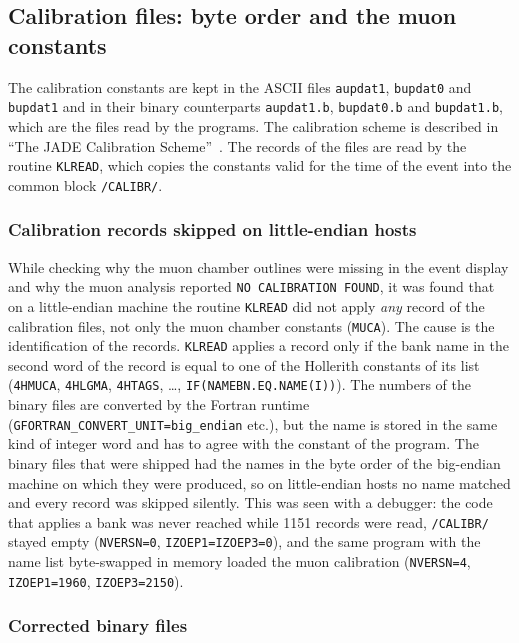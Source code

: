 \subsection{Calibration files: byte order and the muon constants}
\label{sec:calfiles}

The calibration constants are kept in the ASCII files \texttt{aupdat1}, \texttt{bupdat0} and
\texttt{bupdat1} and in their binary counterparts \texttt{aupdat1.b}, \texttt{bupdat0.b} and
\texttt{bupdat1.b}, which are the files read by the programs. The calibration scheme is described in
``The JADE Calibration Scheme''~\cite{JCN:68}. The records of the files
are read by the routine \texttt{KLREAD}, which copies the constants valid for the time of the event
into the common block \texttt{/CALIBR/}.

\subsubsection{Calibration records skipped on little-endian hosts}

While checking why the muon chamber outlines were missing in the event display and why the muon
analysis reported \texttt{NO CALIBRATION FOUND}, it was found that on a little-endian machine the
routine \texttt{KLREAD} did not apply \emph{any} record of the calibration files, not only the muon
chamber constants (\texttt{MUCA}). The cause is the identification of the records. \texttt{KLREAD}
applies a record only if the bank name in the second word of the record is equal to one of the
Hollerith constants of its list (\texttt{4HMUCA}, \texttt{4HLGMA}, \texttt{4HTAGS}, \dots,
\texttt{IF(NAMEBN.EQ.NAME(I))}). The numbers of the binary files are converted by the Fortran
runtime (\texttt{GFORTRAN\_\allowbreak{}CONVERT\_\allowbreak{}UNIT=big\_\allowbreak{}endian} etc.), but the name is stored in the same kind of
integer word and has to agree with the constant of the program. The binary files that were shipped
had the names in the byte order of the big-endian machine on which they were produced, so on
little-endian hosts no name matched and every record was skipped silently. This was seen with a
debugger: the code that applies a bank was never reached while 1151 records were read, \texttt{/CALIBR/}
stayed empty (\texttt{NVERSN=0}, \texttt{IZOEP1=IZOEP3=0}), and the same program with the name list
byte-swapped in memory loaded the muon calibration (\texttt{NVERSN=4}, \texttt{IZOEP1=1960},
\texttt{IZOEP3=2150}).

\subsubsection{Corrected binary files}

